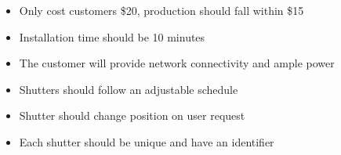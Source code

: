 \begin{itemize}
  \item Only cost customers \$20, production should fall within \$15
  \item Installation time should be 10 minutes 
  \item The customer will provide network connectivity and ample power
  \item Shutters should follow an adjustable schedule
  \item Shutter should change  position on user request
  \item Each shutter should be unique and have an identifier
\end{itemize}